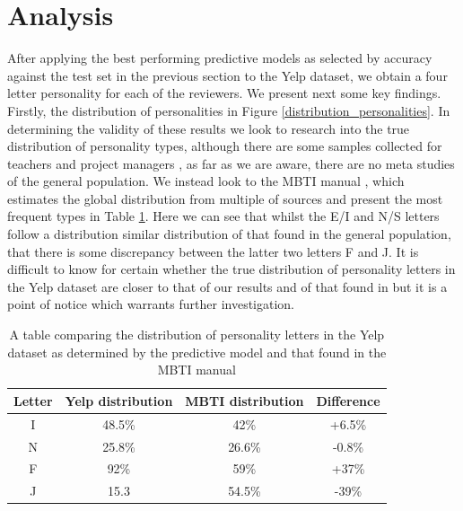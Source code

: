\documentclass[sigconf, nonacm]{acmart}
\begin{document}
\section{Analysis}

After applying the best performing predictive models as selected by accuracy against the test set in the previous section to the Yelp dataset, we obtain a four letter personality for each of the reviewers. We present next some key findings.\\

Firstly, the distribution of personalities in Figure \ref{distribution_personalities}. In determining the validity of these results we look to research into the true distribution of personality types, although there are some samples collected for teachers and project managers \cite{cohen2013mbti, levy1972personality, furnham1993personality}, as far as we are aware, there are no meta studies of the general population. We instead look to the MBTI manual \cite{myers1998mbti}, which estimates the global distribution from multiple of sources and present the most frequent types in Table \ref{type_frequency}. Here we can see that whilst the E/I and N/S letters follow a distribution similar distribution of that found in the general population, that there is some discrepancy between the latter two letters F and J. It is difficult to know for certain whether the true distribution of personality letters in the Yelp dataset are closer to that of our results and of that found in \cite{boyle1995myers} but it is a point of notice which warrants further investigation. \\


\begin{center}
\begin{table}
\begin{tabular}{| c | c | c | c |}
\hline 
Letter & Yelp distribution & MBTI distribution  & Difference \\
\hline
I & 48.5\% & 42\% & +6.5\% \\ 
N & 25.8\% & 26.6\% & -0.8\% \\
F & 92\% & 59\% & +37\% \\
J & 15.3 & 54.5\% & -39\% \\
\hline



\end{tabular}
\caption{A table comparing the distribution of personality letters in the Yelp dataset as determined by the predictive model and that found in the MBTI manual \cite{myers1998mbti}} 
\label{type_frequency}
\end{table}
\end{center}
\end{document}
